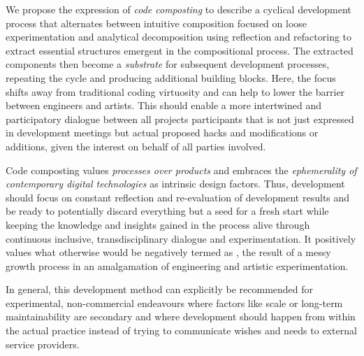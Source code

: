 We propose the expression of \emph{code composting} to describe a cyclical development process that alternates between intuitive composition focused on loose experimentation and analytical decomposition using reflection and refactoring to extract essential structures emergent in the compositional process.
The extracted components then become a \emph{substrate} for subsequent development processes, repeating the cycle and producing additional building blocks.
Here, the focus shifts away from traditional coding virtuosity and can help to lower the barrier between engineers and artists.
This should enable a more intertwined and participatory dialogue between all project\textquotesingle s participants that is not just expressed in development meetings but actual proposed hacks and modifications or additions, given the interest on behalf of all parties involved.

Code composting values \emph{processes over products} and embraces the \emph{ephemerality of contemporary digital technologies} as intrinsic design factors.
Thus, development should focus on constant reflection and re-evaluation of development results and be ready to potentially discard everything but a seed for a fresh start while keeping the knowledge and insights gained in the process alive through continuous inclusive, transdisciplinary dialogue and experimentation.
It positively values what otherwise would be negatively termed as , the result of a messy growth process in an amalgamation of engineering and artistic experimentation.

In general, this development method can explicitly be recommended for experimental, non-commercial endeavours where factors like scale or long-term maintainability are secondary and where development should happen from within the actual practice instead of trying to communicate wishes and needs to external service providers.
